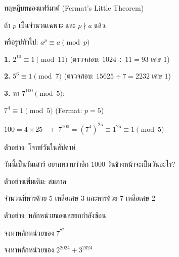 \documentclass[11pt, aspectratio=169]{beamer}
\begin{document}
\begin{frame}{ทฤษฎีบทของแฟร์มาต์ (Fermat's Little Theorem)}
  \begin{explanation}
    ถ้า $p$ เป็นจำนวนเฉพาะ และ $p \nmid a$ แล้ว:


    หรือรูปทั่วไป: $a^p \equiv a \pmod{p}$
  \end{explanation}

  \begin{exambox}[ตัวอย่าง]
    \textbf{1.} $2^{10} \equiv 1 \pmod{11}$ \quad (ตรวจสอบ: $1024 \div 11 = 93$ เศษ $1$)

    \textbf{2.} $5^{6} \equiv 1 \pmod{7}$ \quad (ตรวจสอบ: $15625 \div 7 = 2232$ เศษ $1$)

    \textbf{3.} หา $7^{100} \pmod{5}$:

    $7^4 \equiv 1 \pmod{5}$ \quad (Fermat: $p=5$)

    $100 = 4 \times 25$ \quad $\rightarrow$ \quad
    $7^{100} = (7^4)^{25} \equiv 1^{25} \equiv 1 \pmod{5}$
  \end{exambox}
\end{frame}

\begin{frame}[t]{ตัวอย่าง: โจทย์วันในสัปดาห์}
  \begin{exambox}[โจทย์]
    วันนี้เป็นวันเสาร์ อยากทราบว่าอีก $1000$ วันข้างหน้าจะเป็นวันอะไร?
  \end{exambox}

  \vspace{\fill}
\end{frame}

\begin{frame}[t]{ตัวอย่างเพิ่มเติม: สมภาค}
  \begin{exambox}[โจทย์]
    จำนวนที่หารด้วย 5 เหลือเศษ 3 และหารด้วย 7 เหลือเศษ 2
  \end{exambox}

  \vspace{\fill}
\end{frame}

\begin{frame}[t]{ตัวอย่าง: หลักหน่วยของเลขยกกำลังซ้อน}
  \begin{exambox}[โจทย์]
    จงหาหลักหน่วยของ $7^{7^{7}}$
  \end{exambox}

  \vspace{\fill}

  \begin{exambox}[โจทย์]
    จงหาหลักหน่วยของ $2^{2024} + 3^{2024}$
  \end{exambox}

  \vspace{\fill}
\end{frame}
\end{document}
